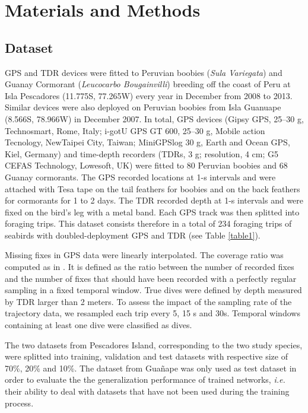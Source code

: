 \documentclass{article}
\begin{document}
\section{Materials and Methods}
\subsection{Dataset}

GPS and TDR devices were fitted to Peruvian boobies (\textit{Sula Variegata}) and Guanay Cormorant
(\textit{Leucocarbo Bougainvilli}) breeding off the coast of Peru at Isla Pescadores (11.775\degree S, 77.265\degree W) every year in December from 2008 to 2013. Similar devices were also deployed on Peruvian boobies from Isla Guanuape (8.566\degree S, 78.966\degree W) in December 2007.
In total, GPS devices (Gipsy GPS, 25–30 g, Technosmart, Rome, Italy; i-gotU GPS GT 600, 25–30 g, Mobile action Tecnology, NewTaipei City, Taiwan; MiniGPSlog 30 g, Earth and Ocean GPS, Kiel, Germany) and time-depth recorders (TDRs, 3 g; resolution, 4 cm; G5
CEFAS Technology, Lowesoft, UK) were fitted to 80 Peruvian boobies and 68 Guanay cormorants. The GPS recorded locations at 1-s intervals and were attached with Tesa tape on the tail feathers for boobies and on the back feathers for cormorants for 1 to 2 days. The TDR recorded depth at 1-s intervals and were fixed on the bird's leg with a metal band. Each GPS track was then splitted into foraging trips. This dataset consists therefore in a total of 234 foraging trips of seabirds with doubled-deployment GPS and TDR (see Table \ref{table1}).

Missing fixes in GPS data were linearly interpolated.
The coverage ratio was computed as in \citep{browning_predicting_2018}.
It is defined as the ratio between the number of recorded fixes and the number of fixes that should have been recorded with a perfectly regular sampling in a fixed temporal window.
True dives were defined by depth measured by TDR larger than 2 meters. To assess the impact of the sampling rate of the trajectory data, we resampled each trip every 5, 15 s and 30s. Temporal windows containing at least one dive were classified as dives.

The two datasets from Pescadores Island, corresponding to the two study species,  were splitted into training, validation and test datasets with respective size of 70\%, 20\% and 10\%. The dataset from Guañape was only used as test dataset in order to evaluate the the generalization performance of trained networks, {\em i.e.} their ability to deal with datasets that have not been used during the training process.
\end{document}
